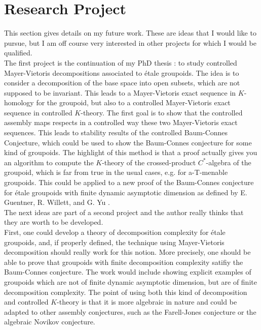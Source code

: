 \section{Research Project}

This section gives details on my future work. These are ideas that I would like to pursue, but I am off course very interested in other projects for which I would be qualified.\\

The first project is the continuation of my PhD thesis : to study controlled Mayer-Vietoris decompositions associated to étale groupoids. The idea is to consider a decomposition of the base space into open subsets, which are not supposed to be invariant. This leads to a Mayer-Vietoris exact sequence in $K$-homology for the groupoid, but also to a controlled Mayer-Vietoris exact sequence in controlled $K$-theory. The first goal is to show that the controlled assembly maps respects in a controlled way these two Mayer-Vietoris exact sequences. This leads to stability results of the controlled Baum-Connes Conjecture, which could be used to show the Baum-Connes conjecture for some kind of groupoids. The highlight of this method is that a proof actually gives you an algorithm to compute the $K$-theory of the crossed-product $C^*$-algebra of the groupoid, which is far from true in the usual cases, e.g. for a-T-menable groupoids. %
This could be applied to a new proof of the Baum-Connes conjecture for étale groupoids with finite dynamic asymptotic dimension as defined by E. Guentner, R. Willett, and G. Yu \cite{GWY}.\\

The next ideas are part of a second project and the author really thinks that they are worth to be developed.\\

First, one could develop a theory of decomposition complexity for étale groupoids, and, if properly defined, the technique using Mayer-Vietoris decomposition should really work for this notion. More precisely, one should be able to prove that groupoids with finite decomposition complexity satifiy the Baum-Connes conjecture. The work would include showing explicit examples of groupoids which are not of finite dynamic asymptotic dimension, but are of finite decomposition complexity. The point of using both this kind of decomposition and controlled $K$-theory is that it is more algebraic in nature and could be adapted to other assembly conjectures, such as the Farell-Jones conjecture or the algebraic Novikov conjecture. \cite{RTY} \\

